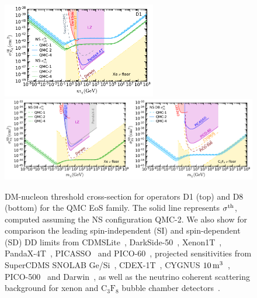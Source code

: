 \begin{figure}[t!bp]
   \centering 
\includegraphics[width=0.6\textwidth]{capture_3/sigmath_mdm_SI_meff.pdf}
\includegraphics[width=\textwidth]{capture_3/sigmath_mdm_SD_meff.pdf}
   \caption[DM-nucleon threshold cross-section for operators D1 (top) and D8 (bottom) for the QMC EoS family. The solid line represents $\sigmath$, computed assuming the NS configuration QMC-2. ]{ DM-nucleon threshold cross-section for operators D1 (top) and D8 (bottom) for the QMC EoS family. The solid line represents $\sigmath$, computed assuming the NS configuration QMC-2. 
   We also show for comparison the leading spin-independent (SI) and spin-dependent (SD) DD limits from CDMSLite~\cite{SuperCDMS:2017nns_Lowmassdarkmatter}, DarkSide-50~\cite{DarkSide:2018bpj_Lowmassdarkmatter},  Xenon1T~\cite{XENON:2019rxp_ConstrainingspindependentWIMPnucleon,XENON:2019gfn_Lightdarkmatter, XENON:2019zpr_Searchlightdark,XENON:2020gfr_mar_SearchCoherentElastic}, PandaX-4T~\cite{PandaX-4T:2021bab_dec_DarkMatterSearch}, PICASSO~\cite{Behnke:2016lsk_apr_FinalResultsPICASSO} and PICO-60~\cite{PICO:2019vsc_jul_Darkmattersearch},  projected sensitivities from SuperCDMS SNOLAB Ge/Si~\cite{SuperCDMS:2016wui_ProjectedsensitivitySuperCDMS}, CDEX-1T~\cite{Yue:2016epq_CDEXdarkmatter}, CYGNUS  $10{\rm \,m}^3$~\cite{Vahsen:2020pzb_aug_CYGNUSFeasibilitynuclear},  PICO-500~\cite{VazquezJauregui_PICO500LSimulations500L} and Darwin~\cite{DARWIN:2016hyl_DARWINultimatedark}, as well as the neutrino coherent scattering background for xenon and $\mathrm{C_3F_8}$ bubble chamber detectors~\cite{Ruppin:2014bra_oct_Complementaritydarkmatter}.  
   } 
   \label{ch5:fig:sigmath}
\end{figure}


